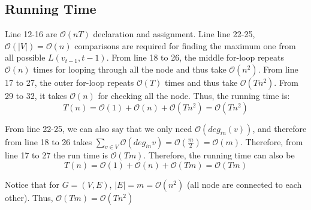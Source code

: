 \documentclass[openany]{article}
\begin{document}
\subsection*{Running Time}
Line 12-16 are $\mathcal{O}(nT)$ declaration and assignment. Line line 22-25, $\mathcal{O}(|V|) = \mathcal{O}(n)$ comparisons are required for finding the maximum one from all possible $L(v_{t-1},t-1)$. From line 18 to 26, the middle for-loop repeats $\mathcal{O}(n)$ times for looping through all the node and thus take $\mathcal{O}(n^2)$. From line 17 to 27, the outer for-loop repeats $\mathcal{O}(T)$ times and thus take $\mathcal{O}(Tn^2)$. From 29 to 32, it takes $\mathcal{O}(n)$ for checking all the node. Thus, the running time is:
\[T(n) = \mathcal{O}(1) + \mathcal{O}(n)+ \mathcal{O}(Tn^2) = \mathcal{O}(Tn^2)\]

From line 22-25, we can also say that we only need $\mathcal{O}(deg_{in}(v))$, and therefore from line 18 to 26 takes $\sum_{v\in V} \mathcal{O}(deg_{in}v) = \mathcal{O}(\frac{m}{2}) = \mathcal{O}(m)$. Therefore, from line 17 to 27 the run time is $\mathcal{O}(Tm)$. Therefore, the running time can also be
\[T(n) = \mathcal{O}(1) + \mathcal{O}(n)+ \mathcal{O}(Tm) = \mathcal{O}(Tm)\]

Notice that for $G=(V,E)$, $|E|=m=\mathcal{O}(n^2)$ (all node are connected to each other). Thus, $\mathcal{O}(Tm) = \mathcal{O}(Tn^2)$
\end{document}
